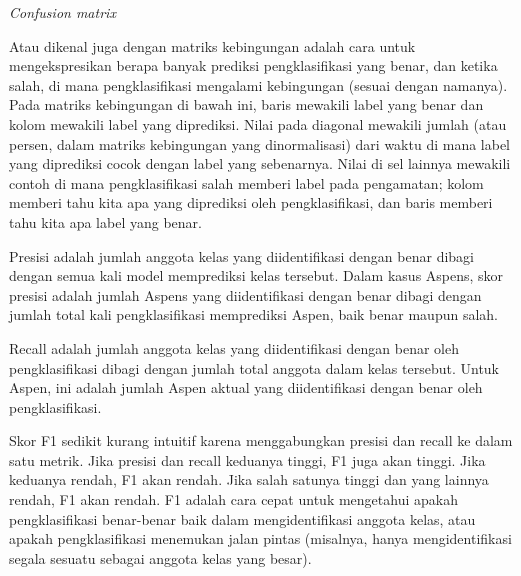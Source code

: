 \textit{Confusion matrix}

Atau dikenal juga dengan matriks kebingungan adalah cara untuk mengekspresikan berapa banyak prediksi pengklasifikasi yang benar, dan ketika salah, di mana pengklasifikasi mengalami kebingungan (sesuai dengan namanya). Pada matriks kebingungan di bawah ini, baris mewakili label yang benar dan kolom mewakili label yang diprediksi. Nilai pada diagonal mewakili jumlah (atau persen, dalam matriks kebingungan yang dinormalisasi) dari waktu di mana label yang diprediksi cocok dengan label yang sebenarnya. Nilai di sel lainnya mewakili contoh di mana pengklasifikasi salah memberi label pada pengamatan; kolom memberi tahu kita apa yang diprediksi oleh pengklasifikasi, dan baris memberi tahu kita apa label yang benar.

Presisi adalah jumlah anggota kelas yang diidentifikasi dengan benar dibagi dengan semua kali model memprediksi kelas tersebut. Dalam kasus Aspens, skor presisi adalah jumlah Aspens yang diidentifikasi dengan benar dibagi dengan jumlah total kali pengklasifikasi memprediksi Aspen, baik benar maupun salah.

Recall adalah jumlah anggota kelas yang diidentifikasi dengan benar oleh pengklasifikasi dibagi dengan jumlah total anggota dalam kelas tersebut. Untuk Aspen, ini adalah jumlah Aspen aktual yang diidentifikasi dengan benar oleh pengklasifikasi.

Skor F1 sedikit kurang intuitif karena menggabungkan presisi dan recall ke dalam satu metrik. Jika presisi dan recall keduanya tinggi, F1 juga akan tinggi. Jika keduanya rendah, F1 akan rendah. Jika salah satunya tinggi dan yang lainnya rendah, F1 akan rendah. F1 adalah cara cepat untuk mengetahui apakah pengklasifikasi benar-benar baik dalam mengidentifikasi anggota kelas, atau apakah pengklasifikasi menemukan jalan pintas (misalnya, hanya mengidentifikasi segala sesuatu sebagai anggota kelas yang besar).